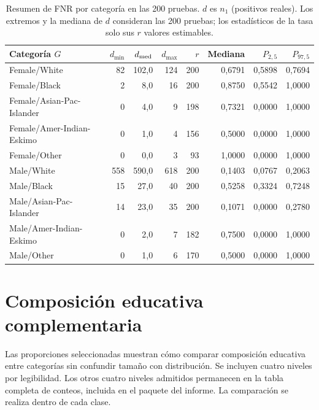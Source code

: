 \documentclass[11pt,a4paper]{article}
\begin{document}
\begin{table}[H]
\centering
\caption[Resumen de FNR por categoría en las 200 pruebas.]{Resumen de FNR por categoría en las 200 pruebas. $d$ es $n_1$ (positivos reales). Los extremos y la mediana de $d$ consideran las 200 pruebas; los estadísticos de la tasa solo sus $r$ valores estimables.}\label{tab:resumenFNR}
\small
\setlength{\tabcolsep}{4pt}
\begin{tabular}{lrrrrrrr}
\toprule
Categoría $G$ & $d_{\min}$ & $d_{\rm med}$ & $d_{\max}$ & $r$ & Mediana & $P_{2,5}$ & $P_{97,5}$ \\
\midrule
Female/White & 82 & 102,0 & 124 & 200 & 0,6791 & 0,5898 & 0,7694 \\
Female/Black & 2 & 8,0 & 16 & 200 & 0,8750 & 0,5542 & 1,0000 \\
Female/Asian-Pac-Islander & 0 & 4,0 & 9 & 198 & 0,7321 & 0,0000 & 1,0000 \\
Female/Amer-Indian-Eskimo & 0 & 1,0 & 4 & 156 & 0,5000 & 0,0000 & 1,0000 \\
Female/Other & 0 & 0,0 & 3 & 93 & 1,0000 & 0,0000 & 1,0000 \\
Male/White & 558 & 590,0 & 618 & 200 & 0,1403 & 0,0767 & 0,2063 \\
Male/Black & 15 & 27,0 & 40 & 200 & 0,5258 & 0,3324 & 0,7248 \\
Male/Asian-Pac-Islander & 14 & 23,0 & 35 & 200 & 0,1071 & 0,0000 & 0,2780 \\
Male/Amer-Indian-Eskimo & 0 & 2,0 & 7 & 182 & 0,7500 & 0,0000 & 1,0000 \\
Male/Other & 0 & 1,0 & 6 & 170 & 0,5000 & 0,0000 & 1,0000 \\
\bottomrule
\end{tabular}
\end{table}

\clearpage
\section{Composición educativa complementaria}
Las proporciones seleccionadas muestran cómo comparar composición educativa entre categorías sin confundir tamaño con distribución. Se incluyen cuatro niveles por legibilidad. Los otros cuatro niveles admitidos permanecen en la tabla completa de conteos, incluida en el paquete del informe. La comparación se realiza dentro de cada clase.
\end{document}

